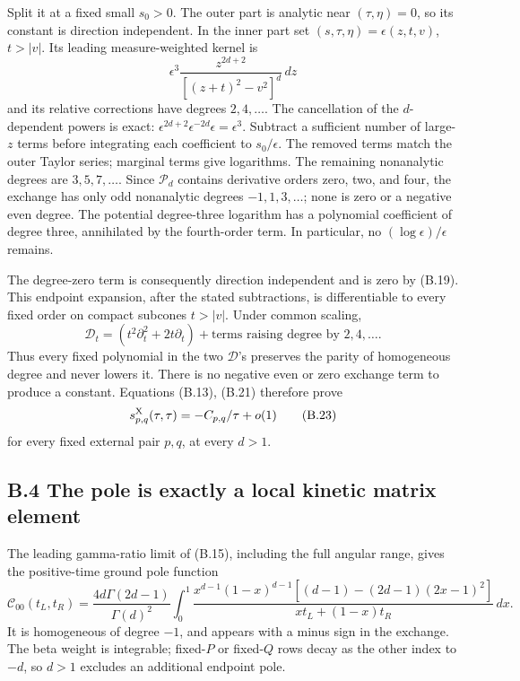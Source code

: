 Split it at a fixed small \(s_0>0\). The outer part is analytic near \((\tau,\eta)=0\), so its constant is direction independent. In the inner part set \((s,\tau,\eta)=\epsilon(z,t,v)\), \(t>|v|\). Its leading measure-weighted kernel is \[
\epsilon^3\frac{z^{2d+2}}{[(z+t)^2-v^2]^d}\,dz
\] and its relative corrections have degrees \(2,4,\ldots\). The cancellation of the \(d\)-dependent powers is exact: \(\epsilon^{2d+2}\epsilon^{-2d}\epsilon=\epsilon^3\). Subtract a sufficient number of large-\(z\) terms before integrating each coefficient to \(s_0/\epsilon\). The removed terms match the outer Taylor series; marginal terms give logarithms. The remaining nonanalytic degrees are \(3,5,7,\ldots\). Since \(\mathcal P_d\) contains derivative orders zero, two, and four, the exchange has only odd nonanalytic degrees \(-1,1,3,\ldots\); none is zero or a negative even degree. The potential degree-three logarithm has a polynomial coefficient of degree three, annihilated by the fourth-order term. In particular, no \((\log\epsilon)/\epsilon\) remains.

The degree-zero term is consequently direction independent and is zero by (B.19). This endpoint expansion, after the stated subtractions, is differentiable to every fixed order on compact subcones \(t>|v|\). Under common scaling, \[
\mathscr D_t=(t^2\partial_t^2+2t\partial_t)
+\text{terms raising degree by }2,4,\ldots .
\tag{B.22}
\] Thus every fixed polynomial in the two \(\mathscr D\)'s preserves the parity of homogeneous degree and never lowers it. There is no negative even or zero exchange term to produce a constant. Equations (B.13), (B.21) therefore prove \[
s^{\rm X}_{p,q}(\tau,\tau)=-C_{p,q}/\tau+o(1)
\tag{B.23}
\] for every fixed external pair \(p,q\), at every \(d>1\).

\hypertarget{b.4-the-pole-is-exactly-a-local-kinetic-matrix-element}{%
\subsection{B.4 The pole is exactly a local kinetic matrix element}\label{b.4-the-pole-is-exactly-a-local-kinetic-matrix-element}}

The leading gamma-ratio limit of (B.15), including the full angular range, gives the positive-time ground pole function \[
\mathcal C_{00}(t_L,t_R)
=\frac{4d\Gamma(2d-1)}{\Gamma(d)^2}
\int_0^1
\frac{x^{d-1}(1-x)^{d-1}
[(d-1)-(2d-1)(2x-1)^2]}
{xt_L+(1-x)t_R}\,dx .
\tag{B.24}
\] It is homogeneous of degree \(-1\), and appears with a minus sign in the exchange. The beta weight is integrable; fixed-\(P\) or fixed-\(Q\) rows decay as the other index to \(-d\), so \(d>1\) excludes an additional endpoint pole.

